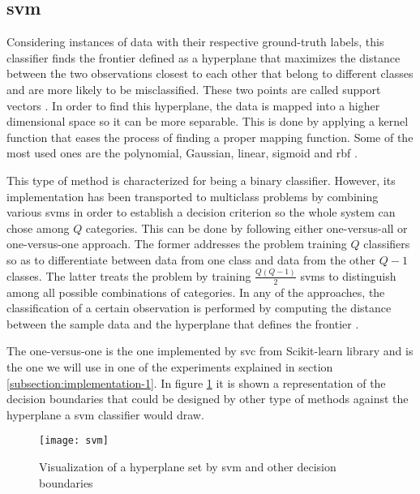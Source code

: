 
\subsection{\acrfull{svm}}
\label{subsection:svm}

	Considering instances of data with their respective ground-truth labels, this classifier finds the frontier defined as a hyperplane that maximizes the distance between the two observations closest to each other that belong to different classes and are more likely to be misclassified. These two points are called support vectors \cite{Fu2011}. In order to find this hyperplane, the data is mapped into a higher dimensional space so it can be more separable. This is done by applying a kernel function that eases the process of finding a proper mapping function. Some of the most used ones are the polynomial, Gaussian, linear, sigmoid and \acrshort{rbf} \cite{Bhattacharyya2018}.
	
	This type of method is characterized for being a binary classifier. However, its implementation has been transported to multiclass problems by combining various \acrshort{svm}s in order to establish a decision criterion so the whole system can chose among $Q$ categories. This can be done by following either one-versus-all or one-versus-one approach. The former addresses the problem training $Q$ classifiers so as to differentiate between data from one class and data from the other $Q-1$ classes. The latter treats the problem by training $\frac{Q(Q-1)}{2}$ \acrshort{svm}s to distinguish among all possible combinations of categories. In any of the approaches, the classification of a certain observation is performed by computing the distance between the sample data and the hyperplane that defines the frontier \cite{Barchiesi2015}. 
	
	The one-versus-one is the one implemented by \acrfull{svc} from Scikit-learn library and is the one we will use in one of the experiments explained in section \ref{subsection:implementation-1}. In figure \ref{fig:mesh10} it is shown a representation of the decision boundaries that could be designed by other type of methods against the hyperplane a \acrshort{svm} classifier would draw.
	
	\begin{figure}[H]
		\centering
		\captionsetup{justification=centering}
		\texttt{[image: svm]}
		\caption{Visualization of a hyperplane set by \acrshort{svm} and other decision boundaries \cite{Drakos2018}}
		\label{fig:mesh10}
	\end{figure}
